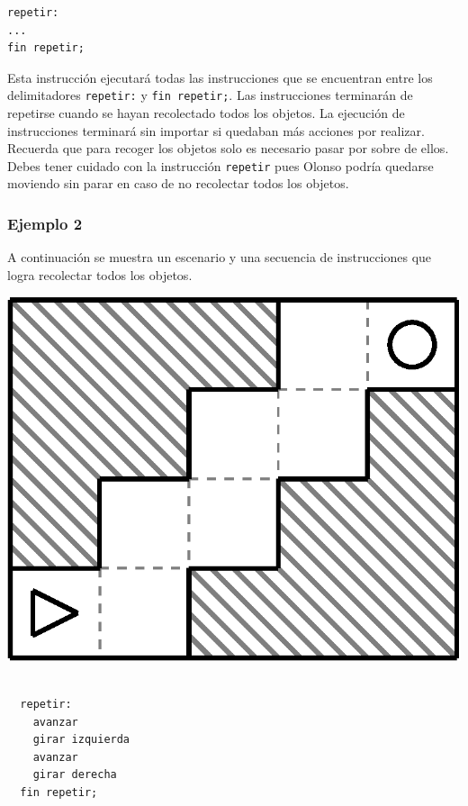 \documentclass{oci}
\def\bgcolor{\par\setbox0\vbox\bgroup}
\def\endbgcolor{\egroup\fboxsep0pt \noindent\colorbox[gray]{0.95}{\usebox0}\par}
\begin{document}
\begin{problemDescription}
\begin{verbatim}
repetir:
...
fin repetir;
\end{verbatim}

Esta instrucción ejecutará todas las instrucciones que se encuentran entre los delimitadores \texttt{repetir:} y \texttt{fin repetir;}.
Las instrucciones terminarán de repetirse cuando se hayan recolectado todos los objetos.
La ejecución de instrucciones terminará sin importar si quedaban más acciones por realizar.
Recuerda que para recoger los objetos solo es necesario pasar por sobre de ellos.
Debes tener cuidado con la instrucción \texttt{repetir} pues Olonso podría quedarse moviendo sin parar en caso de no recolectar todos los objetos.

\subsubsection*{Ejemplo 2}
A continuación se muestra un escenario y una secuencia de instrucciones que logra recolectar todos los objetos.

\begin{minipage}{0.5\linewidth}
  \centering
  \includegraphics[scale=0.45]{laberintos/ejemplo2.eps}
\end{minipage}
\begin{minipage}{0.5\linewidth}
  \centering
 \bgcolor{}
\begin{verbatim}

  repetir:
    avanzar
    girar izquierda
    avanzar
    girar derecha
  fin repetir;
\end{verbatim}
 \endbgcolor{}
\end{minipage}



\end{problemDescription}
\end{document}
